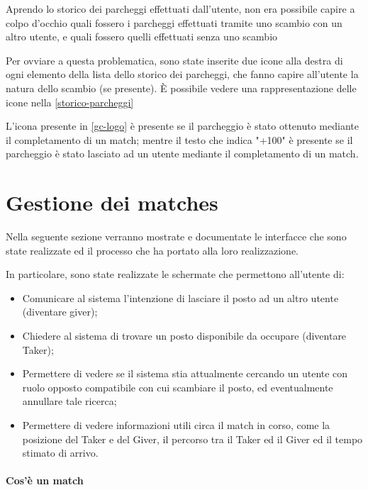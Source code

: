 Aprendo lo storico dei parcheggi effettuati dall'utente, non era possibile capire a colpo d'occhio quali fossero i parcheggi effettuati tramite uno scambio con un altro utente, e quali fossero quelli effettuati senza uno scambio

Per ovviare a questa problematica, sono state inserite due icone alla destra di ogni elemento della lista dello storico dei parcheggi, che fanno capire all'utente la natura dello scambio (se presente). È possibile vedere una rappresentazione delle icone nella \autoref{storico-parcheggi}

L'icona presente in \autoref{gc-logo} è presente se il parcheggio è stato ottenuto mediante il completamento di un match; mentre il testo che indica "+100" è presente se il parcheggio è stato lasciato ad un utente mediante il completamento di un match. 

\pagebreak


\hypertarget{progettazione-del-sistema-di-scambio}{%
\section{Gestione dei matches}\label{progettazione-del-sistema-di-scambio}}

Nella seguente sezione verranno mostrate e documentate le interfacce che sono state realizzate ed il processo che ha portato alla loro realizzazione.

In particolare, sono state realizzate le schermate che permettono all'utente di:
\begin{itemize}      \item Comunicare al sistema l'intenzione di lasciare il posto ad un altro utente (diventare giver);      \item Chiedere al sistema di trovare un posto disponibile da occupare (diventare Taker);      \item Permettere di vedere se il sistema stia attualmente cercando un utente con ruolo opposto compatibile con cui scambiare il posto, ed eventualmente annullare tale ricerca;      \item Permettere di vedere informazioni utili circa il match in corso, come  la posizione del Taker e del Giver, il percorso tra il  Taker ed il Giver ed il tempo stimato di arrivo.
\end{itemize}
\hypertarget{cosuxe8-un-match}{%
\paragraph{Cos'è un match}\label{cosuxe8-un-match}}

